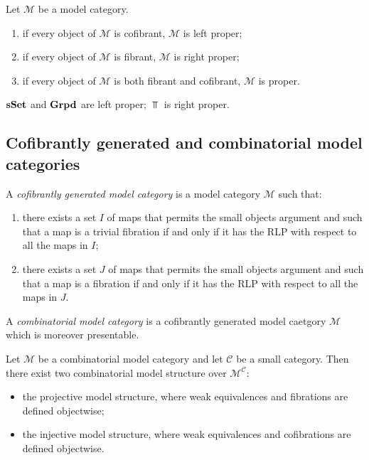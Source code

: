 \begin{refsection}
\begin{cor}
Let $\mathcal M$ be a model category.
\begin{enumerate}
\item if every object of $\mathcal M$ is cofibrant, $\mathcal M$ is left proper;
\item if every object of $\mathcal M$ is fibrant, $\mathcal M$ is right proper;
\item if every object of $\mathcal M$ is both fibrant and cofibrant, $\mathcal M$ is proper.
\end{enumerate}
\end{cor}

\begin{cor}
$\mathbf{s\,\!\mathbf{Set}}$ and $\mathbf{Grpd}$ are left proper; $\Top$ is right proper.
\end{cor}

\subsection{Cofibrantly generated and combinatorial model categories}

\begin{defin}
A \emph{cofibrantly generated model category} is a model category $\mathcal M$ such that:
\begin{enumerate}
\item there exists a set $I$ of maps that permits the small objects argument and such that a map is a trivial fibration if and only if it has the RLP with respect to all the maps in $I$;
\item there exists a set $J$ of maps that permits the small objects argument and such that a map is a fibration if and only if it has the RLP with respect to all the maps in $J$.
\end{enumerate}
\end{defin}

\begin{defin} \label{def combinatorial}
A \emph{combinatorial model category} is a cofibrantly generated model caetgory $\mathcal M$ which is moreover presentable.
\end{defin}

\begin{thm} \label{thm combinatorial functor cat}
Let $\mathcal M$ be a combinatorial model category and let $\mathcal C$ be a small category. Then there exist two combinatorial model structure over $\mathcal M^{\mathcal C}$:
\begin{itemize}
\item the projective model structure, where weak equivalences and fibrations are defined objectwise;
\item the injective model structure, where weak equivalences and cofibrations are defined objectwise.
\end{itemize}
\end{thm}


\end{refsection}
